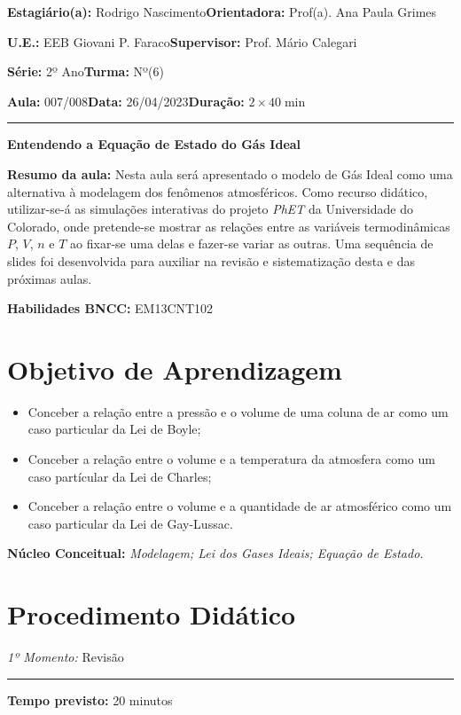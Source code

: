 \par\noindent\textbf{Estagiário(a):} Rodrigo Nascimento\hfill{}\textbf{Orientadora:} Prof(a). Ana Paula Grimes
\par\noindent\textbf{U.E.:} EEB Giovani P. Faraco\hfill{}\textbf{Supervisor:} Prof. Mário Calegari
\par\noindent\textbf{Série:} 2º Ano\hfill{}\textbf{Turma:} Nº(6)
\par\noindent\textbf{Aula:} 007/008\hfill{}\textbf{Data:} 26/04/2023\hfill{}\textbf{Duração:} $2\times 40\min$
\rule{\textwidth}{.5pt}
\bigskip{}  
\noindent
\begin{center}
	\textbf{Entendendo a Equação de Estado do Gás Ideal}
\end{center}
\par\noindent\textbf{Resumo da aula:} Nesta aula será apresentado o modelo de Gás Ideal como uma alternativa à modelagem dos fenômenos atmosféricos. Como recurso didático, utilizar-se-á as simulações interativas do projeto \textit{PhET} da Universidade do Colorado, onde pretende-se mostrar as relações entre as variáveis termodinâmicas $P$, $V$, $n$ e $T$ ao fixar-se uma delas e fazer-se variar as outras. Uma sequência de slides foi desenvolvida para auxiliar na revisão e sistematização desta e das próximas aulas.
\par\noindent\textbf{Habilidades BNCC:} EM13CNT102

\section*{Objetivo de Aprendizagem}
\begin{itemize}
	\item Conceber a relação entre a pressão e o volume de uma coluna de ar como um caso particular da Lei de Boyle;
	\item Conceber a relação entre o volume e a temperatura da atmosfera como um caso partícular da Lei de Charles;
	\item Conceber a relação entre o volume e a quantidade de ar atmosférico como um caso particular da Lei de Gay-Lussac.
\end{itemize}

\medskip{}

\noindent\textbf{Núcleo Conceitual:} \emph{Modelagem; Lei dos Gases Ideais; Equação de Estado.}
\newpage

\section*{Procedimento Didático} 
\par\noindent\emph{1º Momento:} Revisão
\par\noindent\rule{.3\textwidth}{.5pt}  
\par\noindent\textbf{Tempo previsto:} 20 minutos

